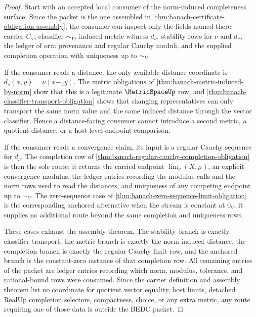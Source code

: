 \begin{proof}
Start with an accepted local consumer of the norm-induced completeness
surface. Since the packet is the one assembled in
\autoref{thm:banach-certificate-obligation-assembly}, the consumer can inspect
only the fields named there: carrier $C_V$, classifier $\sim_V$, induced
metric witness $d_\nu$, stability rows for $\nu$ and $d_\nu$, the ledger of
orm provenance and regular Cauchy moduli, and the supplied completion
operation with uniqueness up to $\sim_V$.

If the consumer reads a distance, the only available distance coordinate is
$d_\nu(x,y)=\nu(x-_V y)$. The metric obligations of
\autoref{thm:banach-metric-induced-by-norm} show that this is a legitimate
$\MetricSpaceUp$ row, and
\autoref{thm:banach-classifier-transport-obligation} shows that changing
representatives can only transport the same norm value and the same induced
distance through the vector classifier. Hence a distance-facing consumer
cannot introduce a second metric, a quotient distance, or a host-level
endpoint comparison.

If the consumer reads a convergence claim, its input is a regular Cauchy
sequence for $d_\nu$. The completion row of
\autoref{thm:banach-regular-cauchy-completion-obligation} is then the sole
route: it returns the carried endpoint $\lim_\nu(X,\mu)$, an explicit
convergence modulus, the ledger entries recording the modulus calls and the
norm rows used to read the distances, and uniqueness of any competing endpoint
up to $\sim_V$. The zero-sequence case of
\autoref{thm:banach-zero-sequence-limit-obligation} is the corresponding
anchored alternative when the stream is constant at $0_V$; it supplies no
additional route beyond the same completion and uniqueness rows.

These cases exhaust the assembly theorem. The stability branch is exactly
classifier transport, the metric branch is exactly the norm-induced distance,
the completion branch is exactly the regular Cauchy limit row, and the anchored
branch is the constant-zero instance of that completion row. All remaining
entries of the packet are ledger entries recording which norm, modulus,
tolerance, and rational-bound rows were consumed. Since the carrier definition
and assembly theorem list no coordinate for quotient vector equality, host
limits, detached RealUp completion selectors, compactness, choice, or any
extra metric, any route requiring one of those data is outside the BEDC packet.
\end{proof}
